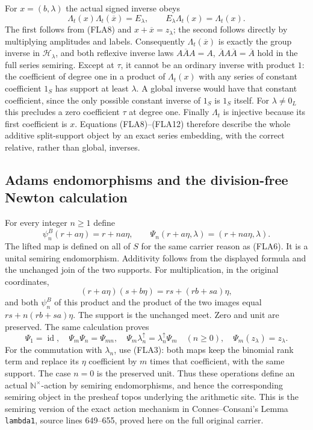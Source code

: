 For $x=(b,\lambda)$ the actual signed inverse obeys
\begin{equation}\tag{FLA12}
 \Lambda_t(x)\Lambda_t(\overline x)=E_\lambda,
 \qquad E_\lambda\Lambda_t(x)=\Lambda_t(x).
\end{equation}
The first follows from (FLA8) and $x+\overline x=z_\lambda$;
the second follows directly by multiplying amplitudes and labels.
Consequently $\Lambda_t(\overline x)$ is exactly the group
inverse in $\mathcal H_\lambda$, and both reflexive inverse laws
$A\overline A A=A$, $\overline A A\overline A=\overline A$
hold in the full series semiring. Except at $\tau$, it cannot be
an ordinary inverse with product $1$: the coefficient of degree
one in a product of $\Lambda_t(x)$ with any series of constant
coefficient $1_S$ has support at least $\lambda$. A global inverse
would have that constant coefficient, since the only possible
constant inverse of $1_S$ is $1_S$ itself. For $\lambda\ne0_L$
this precludes a zero coefficient $\tau$ at degree one.
Finally $\Lambda_t$ is injective because its first coefficient
is $x$. Equations (FLA8)--(FLA12) therefore describe the whole
additive split-support object by an exact series embedding, with
the correct relative, rather than global, inverses.

\subsection{Adams endomorphisms and the division-free Newton calculation}

For every integer $n\ge1$ define
\begin{equation}\tag{FLA13}
 \psi_n^B(r+a\eta)=r+na\eta,\qquad
 \Psi_n(r+a\eta,\lambda)=(r+na\eta,\lambda).
\end{equation}
The lifted map is defined on all of $S$ for the same carrier reason
as (FLA6). It is a unital semiring endomorphism. Additivity follows
from the displayed formula and the unchanged join of the two
supports. For multiplication, in the original coordinates,
\[
 (r+a\eta)(s+b\eta)=rs+(rb+sa)\eta,
\]
and both $\psi_n^B$ of this product and the product of the two
images equal $rs+n(rb+sa)\eta$. The support is the unchanged
meet. Zero and unit are preserved. The same calculation proves
\begin{equation}\tag{FLA14}
 \Psi_1=\operatorname{id},\quad
 \Psi_m\Psi_n=\Psi_{mn},\quad
 \Psi_m\lambda_n^{\uparrow}
       =\lambda_n^{\uparrow}\Psi_m\quad(n\ge0),\quad
 \Psi_m(z_\lambda)=z_\lambda.
\end{equation}
For the commutation with $\lambda_n$, use (FLA3): both maps keep
the binomial rank term and replace its $\eta$ coefficient by $m$
times that coefficient, with the same support. The case $n=0$
is the preserved unit. Thus these operations define an actual
$\mathbb N^\times$-action by semiring endomorphisms, and hence
the corresponding semiring object in the presheaf topos underlying
the arithmetic site. This is the semiring version of the exact
action mechanism in Connes--Consani's Lemma \texttt{lambda1},
source lines 649--655, proved here on the full original carrier.

